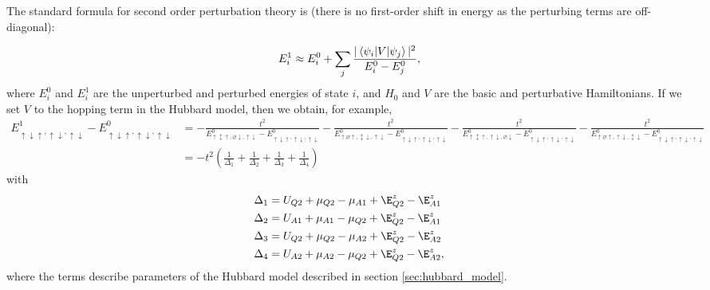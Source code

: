 \documentclass{report}
\begin{document}
\begin{appendices}
The standard formula for second order perturbation theory is (there is no first-order shift in energy as the perturbing terms are off-diagonal):

\begin{equation*}
    E_i^1 \approx E_i^0 + \sum_j{\frac{|\braket{\psi_i|V|\psi_j}|^2}{E_i^0 - E_j^0}},
\end{equation*} where $E_i^0$ and $E_i^1$ are the unperturbed and perturbed energies of state $i$, and $H_0$ and $V$ are the basic and perturbative Hamiltonians. If we set $V$ to the hopping term in the Hubbard model, then we obtain, for example,
\begin{align*}
    E_{\uparrow\downarrow\uparrow,\uparrow\downarrow,\uparrow\downarrow}^1 - E_{\uparrow\downarrow\uparrow,\uparrow\downarrow,\uparrow\downarrow}^0 &= 
    -\frac{t^2}{E_{\uparrow\updownarrow \uparrow,\varnothing\downarrow,\uparrow\downarrow}^0 - E_{\uparrow\downarrow\uparrow,\uparrow\downarrow,\uparrow\downarrow}^0}
    -\frac{t^2}{E_{\uparrow\varnothing \uparrow,\updownarrow\downarrow,\uparrow\downarrow}^0 - E_{\uparrow\downarrow\uparrow,\uparrow\downarrow,\uparrow\downarrow}^0}
    -\frac{t^2}{E_{\uparrow\updownarrow \uparrow,\uparrow\downarrow,\varnothing\downarrow}^0 - E_{\uparrow\downarrow\uparrow,\uparrow\downarrow,\uparrow\downarrow}^0}
    -\frac{t^2}{E_{\uparrow\varnothing \uparrow,\uparrow\downarrow,\updownarrow\downarrow}^0 - E_{\uparrow\downarrow\uparrow,\uparrow\downarrow,\uparrow\downarrow}^0}\\
    &= -t^2\left(\frac{1}{\Delta_1} + \frac{1}{\Delta_2} + \frac{1}{\Delta_3}+ \frac{1}{\Delta_4}\right)
\end{align*} with
\begin{align*}
    \Delta_1 &= U_{Q2} + \mu_{Q2} - \mu_{A1} + \E_{Q2}^z - \E_{A1}^z \\
    \Delta_2 &= U_{A1} + \mu_{A1} - \mu_{Q2} + \E_{Q2}^z - \E_{A1}^z \\
    \Delta_3 &= U_{Q2} + \mu_{Q2} - \mu_{A2} + \E_{Q2}^z - \E_{A2}^z \\
    \Delta_4 &= U_{A2} + \mu_{A2} - \mu_{Q2} + \E_{Q2}^z - \E_{A2}^z, \\
\end{align*} where the terms describe parameters of the Hubbard model described in section \ref{sec:hubbard_model}.


\end{appendices}
\end{document}
